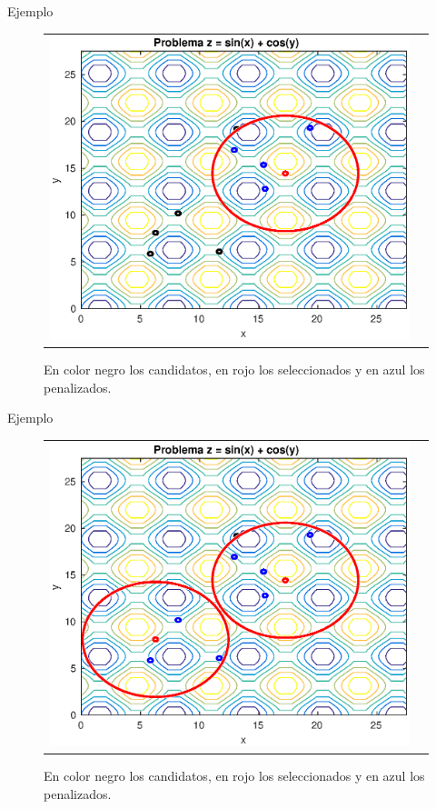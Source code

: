 \documentclass{beamer}
\begin{document}
\begin{frame}{Ejemplo}
\begin{figure}[H]
  \centering
  \begin{tabular}{c c}
   \includegraphics[scale=0.6]{2.eps} 
  \end{tabular}
  \caption{\scriptsize En color negro los candidatos, en rojo los seleccionados y en azul los penalizados.}
\end{figure}
\end{frame}

\begin{frame}{Ejemplo}
\begin{figure}[H]
  \centering
  \begin{tabular}{c c}
   \includegraphics[scale=0.6]{3.eps} 
  \end{tabular}
  \caption{\scriptsize En color negro los candidatos, en rojo los seleccionados y en azul los penalizados.}
\end{figure}
\end{frame}
\end{document}
